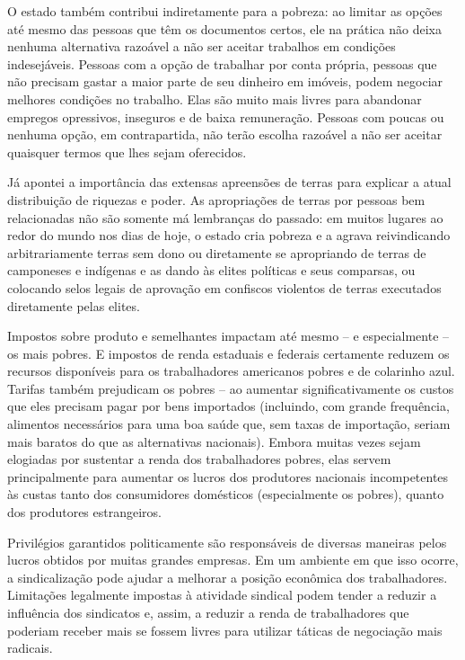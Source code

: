 O estado também contribui indiretamente para a pobreza: ao limitar as opções até mesmo das pessoas que têm os documentos certos, ele na prática não deixa nenhuma alternativa razoável a não ser aceitar trabalhos em condições indesejáveis. Pessoas com a opção de trabalhar por conta própria, pessoas que não precisam gastar a maior parte de seu dinheiro em imóveis, podem negociar melhores condições no trabalho. Elas são muito mais livres para abandonar empregos opressivos, inseguros e de baixa remuneração. Pessoas com poucas ou nenhuma opção, em contrapartida, não terão escolha razoável a não ser aceitar quaisquer termos que lhes sejam oferecidos.

Já apontei a importância das extensas apreensões de terras para explicar a atual distribuição de riquezas e poder. As apropriações de terras por pessoas bem relacionadas não são somente má lembranças do passado: em muitos lugares ao redor do mundo nos dias de hoje, o estado cria pobreza e a agrava reivindicando arbitrariamente terras sem dono ou diretamente se apropriando de terras de camponeses e indígenas e as dando às elites políticas e seus comparsas, ou colocando selos legais de aprovação em confiscos violentos de terras executados diretamente pelas elites.

Impostos sobre produto e semelhantes impactam até mesmo -- e especialmente -- os mais pobres. E impostos de renda estaduais e federais certamente reduzem os recursos disponíveis para os trabalhadores americanos pobres e de colarinho azul. Tarifas também prejudicam os pobres -- ao aumentar significativamente os custos que eles precisam pagar por bens importados (incluindo, com grande frequência, alimentos necessários para uma boa saúde que, sem taxas de importação, seriam mais baratos do que as alternativas nacionais). Embora muitas vezes sejam elogiadas por sustentar a renda dos trabalhadores pobres, elas servem principalmente para aumentar os lucros dos produtores nacionais incompetentes às custas tanto dos consumidores domésticos (especialmente os pobres), quanto dos produtores estrangeiros.

Privilégios garantidos politicamente são responsáveis de diversas maneiras pelos lucros obtidos por muitas grandes empresas. Em um ambiente em que isso ocorre, a sindicalização pode ajudar a melhorar a posição econômica dos trabalhadores. Limitações legalmente impostas à atividade sindical podem tender a reduzir a influência dos sindicatos e, assim, a reduzir a renda de trabalhadores que poderiam receber mais se fossem livres para utilizar táticas de negociação mais radicais.

